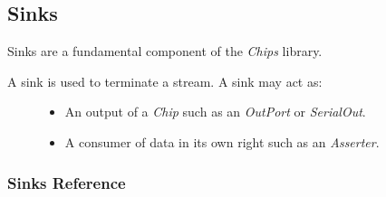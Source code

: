\documentclass[letterpaper,10pt,english]{sphinxmanual}
\begin{document}
\subsection{Sinks}
\label{language_reference/index:sinks}\label{language_reference/index:module-chips.sinks}
Sinks are a fundamental component of the \emph{Chips} library.
\begin{description}
\item[{A sink is used to terminate a stream. A sink may act as:}] \leavevmode\begin{itemize}
\item {} 
An output of a \emph{Chip} such as an \emph{OutPort} or \emph{SerialOut}.

\item {} 
A consumer of data in its own right such as an \emph{Asserter}.

\end{itemize}

\end{description}


\subsubsection{Sinks Reference}
\label{language_reference/index:sinks-reference}
\end{document}
